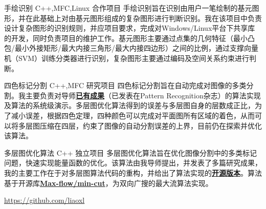 \documentclass[11pt,a4paper,sans]{moderncv}   %
\begin{document}
\begin{CJK}{UTF8}{gbsn}
{手绘识别}
{C++,MFC,Linux}
{合作项目}{}
{手绘识别旨在识别由用户一笔绘制的基元图形，并在此基础上对由基元图形组成的复杂图形进行判断识别。我在该项目中负责设计复杂图形的识别规则，并应项目要求，完成对Windows/Linux平台下共享库的开发，同时负责项目的维护工作。基元图形主要通过点集的几何特征（最小凸包/最小外接矩形/最大内接三角形/最大内接四边形）之间的比例，通过支撑向量机（SVM）训练分类器进行识别，复杂图形主要通过编码及空间关系约束进行判断。}
\vspace*{0.2\baselineskip}

{四色标记分割}
{C++,MFC}
{研究项目}{}
{四色标记分割旨在自动完成对图像的多类分割。我主要负责对导师\textbf{\href{http://www.sciencedirect.com/science/article/pii/S0031320311001907}{已有成果}}（已发表在Pattern Recognition杂志）的算法实现及算法的系统级演示。多层图优化算法得到的误差与多层图自身的层数成正比，为了减小误差，根据四色定理，四种颜色可以完成对平面图所有区域的着色，从而可以将多层图压缩在四层，约束了图像的自动分割误差的上界，目前仍在探索并优化该算法。}
\vspace*{0.2\baselineskip}

{多层图优化算法}
{C++}
{独立项目}{}
{多层图优化算法旨在优化图像分割中的多类标记问题，快速实现能量函数的优化。该算法由我导师提出，并发表了多篇研究成果，我的主要工作在于对多层图算法代码的重构，并给出了算法实现的\textbf{\href{https://github.com/liaoxl/MultiLayerGraph}{开源版本}}。算法基于开源库\textbf{\href{http://vision.csd.uwo.ca/code/}{Max-flow/min-cut}}，为双向广搜的最大流算法实现。}
\vspace*{0.2\baselineskip}

{\href{https://github.com/liaoxl}{https://github.com/liaoxl}}
{}{}{}{}


\renewcommand{\baselinestretch}{1.0}




\closesection{}                   %
\renewcommand{\listitemsymbol}{-} %
\clearpage\end{CJK}
\end{document}
